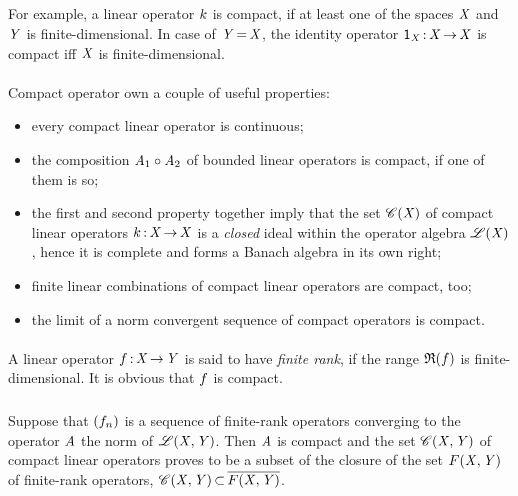 \documentclass[11pt,twoside]{article}
\begin{document}
\begin{itemize}[leftmargin=12pt,itemsep=3pt]
\subparagraph{}
For example,
a linear operator $k$ is compact,
if at least one of the spaces $\mathit{X}$ and $\mathit{Y}$ is finite-dimensional.
In case of $\mathit{Y} {\,=\,} \mathit{X}$,
the identity operator ${\mathsf{1}}_{\mathit{X}} {\,:\,} \mathit{X} {\,\to\,} \mathit{X}$ is compact
iff $\mathit{X}$ is finite-dimensional.

\paragraph{} %
Compact operator own a couple of useful properties:

\begin{itemize}[leftmargin=9mm]
\item[(a)]
every compact linear operator is continuous;

\item[(b)]
the composition $\mathit{A}_1 \circ \mathit{A}_2$ of bounded linear operators
is compact,
if one of them is so;

\item[(c)]
the first and second property together imply that
the set $\mathscr{C}(\mathit{X})$ of compact linear operators $k{\,:\,}\mathit{X} {\,\to\,} \mathit{X}$
is a \textit{closed} ideal within the operator algebra $\mathscr{L}(\mathit{X}) $,
hence it is complete and forms a Banach algebra in its own right;

\item[(d)]
finite linear combinations of compact linear operators are compact, too;

\item[(e)]
the limit of a norm convergent sequence of compact operators is compact.
\end{itemize}

\paragraph{} %
A linear operator $f {\,:\,} \mathit{X} {\,\to\,} \mathit{Y}$ is said
to have \textit{finite rank},
if the range $\mathfrak{R}(f)$ is finite-dimensional.
It is obvious that $f$ is compact.

\subparagraph{}
Suppose that $(f_n)$ is a sequence of finite-rank operators
converging to the operator $\mathit{A}$ {\wrt} the norm of $\mathscr{L}(\mathit{X},\mathit{Y})$.
Then $\mathit{A}$ is compact
and the set $\mathscr{C}(\mathit{X},\mathit{Y})$ of compact linear operators
proves to be a subset of the closure of the set $F(\mathit{X},\mathit{Y})$
of finite-rank operators,
{\ie}
$\mathscr{C}(\mathit{X},\mathit{Y}) {\,\subset\,} \overline{F(\mathit{X},\mathit{Y})}$.


\end{itemize}
\end{document}
